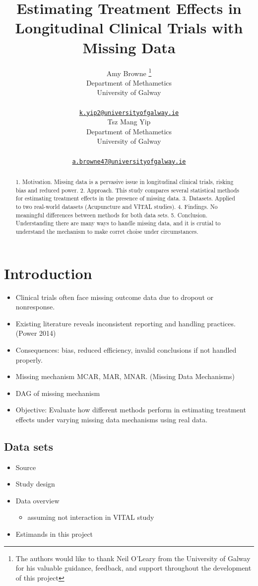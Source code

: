 \documentclass{article}
\title{Estimating Treatment Effects in Longitudinal Clinical Trials with
Missing Data}
\author{
    Amy Browne
    \thanks{The authors would like to thank Neil O'Leary from the
University of Galway for his valuable guidance, feedback, and support
throughout the development of this project}
   \\
    Department of Methametics \\
    University of Galway \\
   \\
  \texttt{\href{mailto:k.yip2@universityofgalway.ie}{\nolinkurl{k.yip2@universityofgalway.ie}}} \\
   \And
    Tsz Mang Yip
   \\
    Department of Methametics \\
    University of Galway \\
   \\
  \texttt{\href{mailto:a.browne47@universityofgalway.ie}{\nolinkurl{a.browne47@universityofgalway.ie}}} \\
  }
\providecommand{\tightlist}{%
  \setlength{\itemsep}{0pt}\setlength{\parskip}{0pt}}
\begin{document}
\maketitle


\begin{abstract}
1. Motivation. Missing data is a pervasive issue in longitudinal
clinical trials, risking bias and reduced power. 2. Approach. This study
compares several statistical methods for estimating treatment effects in
the presence of missing data. 3. Datasets. Applied to two real-world
datasets (Acupuncture and VITAL studies). 4. Findings. No meaningful
differences between methods for both data sets. 5. Conclusion.
Understanding there are many ways to handle missing data, and it is
crutial to understand the mechanism to make corret choise under
circumstances.
\end{abstract}


\section{Introduction}\label{introduction}

\begin{itemize}
\tightlist
\item
  Clinical trials often face missing outcome data due to dropout or
  nonresponse.
\item
  Existing literature reveals inconsistent reporting and handling
  practices.(Power 2014)
\item
  Consequences: bias, reduced efficiency, invalid conclusions if not
  handled properly.
\item
  Missing mechanism MCAR, MAR, MNAR. (Missing Data Mechanisms)
\item
  DAG of missing mechanism
\item
  Objective: Evaluate how different methods perform in estimating
  treatment effects under varying missing data mechanisms using real
  data.
\end{itemize}

\subsection{Data sets}\label{data-sets}

\begin{itemize}
\tightlist
\item
  Source
\item
  Study design
\item
  Data overview

  \begin{itemize}
  \tightlist
  \item
    assuming not interaction in VITAL study
  \end{itemize}
\item
  Estimands in this project
\end{itemize}
\end{document}
